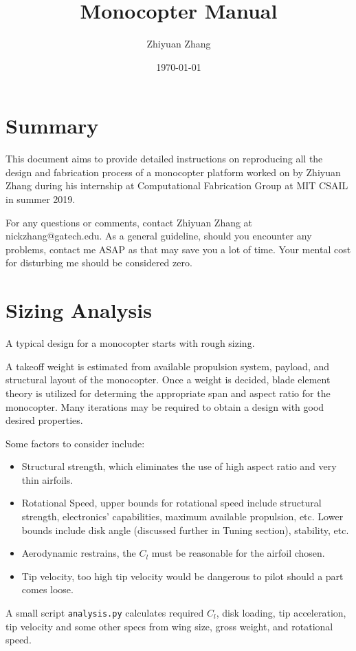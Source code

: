 \documentclass[12pt]{article}
\title{Monocopter Manual}
\author{Zhiyuan Zhang}
\date{\today}
\begin{document}
\maketitle
\section{Summary}
This document aims to provide detailed instructions on reproducing all the design and fabrication process of a monocopter platform worked on by Zhiyuan Zhang during his internship at Computational Fabrication Group at MIT CSAIL in summer 2019.

For any questions or comments, contact Zhiyuan Zhang at nickzhang@gatech.edu. As a general guideline, should you encounter any problems, contact me ASAP as that may save you a lot of time. Your mental cost for disturbing me should be considered zero. 

\section{Sizing Analysis}
A typical design for a monocopter starts with rough sizing. 

A takeoff weight is estimated from available propulsion system, payload, and structural layout of the monocopter. Once a weight is decided, blade element theory is utilized for determing the appropriate span and aspect ratio for the monocopter. Many iterations may be required to obtain a design with good desired properties.

Some factors to consider include:
\begin{itemize}
  \item Structural strength, which eliminates the use of high aspect ratio and very thin airfoils.
  \item Rotational Speed, upper bounds for rotational speed include structural strength, electronics' capabilities, maximum available propulsion, etc. Lower bounds include disk angle (discussed further in Tuning section), stability, etc.
  \item Aerodynamic restrains, the $C_l$ must be reasonable for the airfoil chosen.
  \item Tip velocity, too high tip velocity would be dangerous to pilot should a part comes loose.
\end{itemize}

A small script \texttt{analysis.py} calculates required $C_l$, disk loading, tip acceleration, tip velocity and some other specs from wing size, gross weight, and rotational speed.
\end{document}
